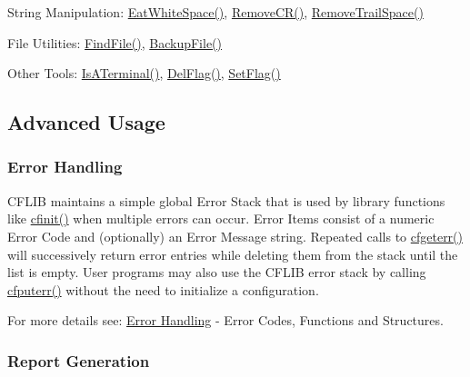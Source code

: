 \begin{DoxyItemize}
\item String Manipulation\-: \hyperlink{group__utilities_ga3b3af548ae02da377ed0a3092e670fd4}{Eat\-White\-Space()}, \hyperlink{group__utilities_ga6ddbeec7bf1d9a94c65cd5ff1e0a9f19}{Remove\-C\-R()}, \hyperlink{group__utilities_ga10200b38583a83087a15432c95567cd4}{Remove\-Trail\-Space()}
\begin{DoxyItemize}
\item File Utilities\-: \hyperlink{group__utilities_ga59fc2b29cf26051e0854b664f5aed15d}{Find\-File()}, \hyperlink{group__utilities_ga0fccda7427db33b2f73a3b6dca864207}{Backup\-File()}
\item Other Tools\-: \hyperlink{group__utilities_ga9a90e738d03b642f33901600671d225a}{Is\-A\-Terminal()}, \hyperlink{group__utilities_gabfbf02b37e47027916f3352798f7d44c}{Del\-Flag()}, \hyperlink{group__utilities_gafcc4d6e712f81df21ea69277d42af839}{Set\-Flag()}
\end{DoxyItemize}
\end{DoxyItemize}\hypertarget{index_advanced}{}\subsection{Advanced Usage}\label{index_advanced}
\hypertarget{index_error_handling}{}\subsubsection{Error Handling}\label{index_error_handling}
C\-F\-L\-I\-B maintains a simple global Error Stack that is used by library functions like \hyperlink{group__cflib__core_ga64fb341565c2ddfccd6669e5e6265a8a}{cfinit()} when multiple errors can occur. Error Items consist of a numeric Error Code and (optionally) an Error Message string. Repeated calls to \hyperlink{group__errors_ga2dc49b60b3ec7a82086e60f4b1c41e18}{cfgeterr()} will successively return error entries while deleting them from the stack until the list is empty. User programs may also use the C\-F\-L\-I\-B error stack by calling \hyperlink{group__errors_gaad2687826308f21b54657d2728e4cfcc}{cfputerr()} without the need to initialize a configuration.

For more details see\-: \hyperlink{group__errors}{Error Handling} -\/ Error Codes, Functions and Structures. \hypertarget{index_reports}{}\subsubsection{Report Generation}\label{index_reports}

